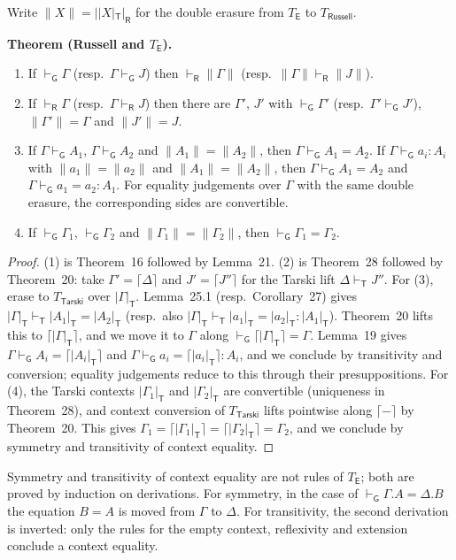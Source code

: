 \documentclass[11pt]{article}
\newenvironment{theorem}[1]{\par\medskip\noindent\textbf{Theorem #1.}\ \itshape}{\par\medskip}
\theoremstyle{definition}
\theoremstyle{remark}
\newcommand{\vdashG}{\vdash_{\mathsf G}}
\newcommand{\vdashT}{\vdash_{\mathsf T}}
\newcommand{\er}[1]{|#1|_{\mathsf T}}
\newcommand{\vdashR}{\vdash_{\mathsf R}}
\newcommand{\erR}[1]{|#1|_{\mathsf R}}
\begin{document}
Write $\|X\| = \erR{\er X}$ for the double erasure from $T_{\mathsf E}$ to
$T_{\mathsf{Russell}}$.

\begin{theorem}{(Russell and $T_{\mathsf E}$)}
\begin{enumerate}
\item If $\vdashG\Gamma$ (resp.\ $\Gamma\vdashG J$) then
$\vdashR\|\Gamma\|$ (resp.\ $\|\Gamma\|\vdashR\|J\|$).
\item If $\vdashR\Gamma$ (resp.\ $\Gamma\vdashR J$) then there are
$\Gamma'$, $J'$ with $\vdashG\Gamma'$ (resp.\ $\Gamma'\vdashG J'$),
$\|\Gamma'\|=\Gamma$ and $\|J'\|=J$.
\item If $\Gamma\vdashG A_1$, $\Gamma\vdashG A_2$ and $\|A_1\|=\|A_2\|$,
then $\Gamma\vdashG A_1=A_2$. If $\Gamma\vdashG a_i:A_i$ with
$\|a_1\|=\|a_2\|$ and $\|A_1\|=\|A_2\|$, then $\Gamma\vdashG A_1=A_2$ and
$\Gamma\vdashG a_1=a_2:A_1$. For equality judgements over $\Gamma$ with the
same double erasure, the corresponding sides are convertible.
\item If $\vdashG\Gamma_1$, $\vdashG\Gamma_2$ and $\|\Gamma_1\|=\|\Gamma_2\|$,
then $\vdashG\Gamma_1=\Gamma_2$.
\end{enumerate}
\end{theorem}
\begin{proof}
(1) is Theorem~16 followed by Lemma~21. (2) is Theorem~28 followed by
Theorem~20: take $\Gamma'=\lceil\Delta\rceil$ and $J'=\lceil J''\rceil$ for the
Tarski lift $\Delta\vdashT J''$. For (3), erase to $T_{\mathsf{Tarski}}$ over
$\er\Gamma$. Lemma~25.1 (resp.\ Corollary~27) gives
$\er\Gamma\vdashT\er{A_1}=\er{A_2}$ (resp.\ also
$\er\Gamma\vdashT\er{a_1}=\er{a_2}:\er{A_1}$). Theorem~20 lifts this to
$\lceil\er\Gamma\rceil$, and we move it to $\Gamma$ along
$\vdashG\lceil\er\Gamma\rceil=\Gamma$. Lemma~19 gives
$\Gamma\vdashG A_i=\lceil\er{A_i}\rceil$ and
$\Gamma\vdashG a_i=\lceil\er{a_i}\rceil:A_i$, and we conclude by transitivity
and conversion; equality judgements reduce to this through their
presuppositions. For (4), the Tarski contexts $\er{\Gamma_1}$ and $\er{\Gamma_2}$
are convertible (uniqueness in Theorem~28), and context conversion of
$T_{\mathsf{Tarski}}$ lifts pointwise along $\lceil-\rceil$ by Theorem~20. This gives
$\Gamma_1=\lceil\er{\Gamma_1}\rceil=\lceil\er{\Gamma_2}\rceil=\Gamma_2$, and we
conclude by symmetry and transitivity of context equality.
\end{proof}
Symmetry and transitivity of context equality are not rules of $T_{\mathsf E}$;
both are proved by induction on derivations. For symmetry, in the case of
$\vdashG\Gamma.A=\Delta.B$ the equation $B=A$ is moved from $\Gamma$ to
$\Delta$. For transitivity, the second derivation is inverted: only the rules
for the empty context, reflexivity and extension conclude a context equality.
\end{document}
